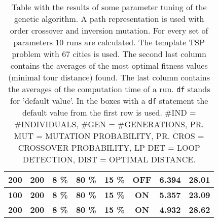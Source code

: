 \begin{table}[!]
\begin{tabular}{|c|c|c|c|c|c|c|c|}
\textbf{200}         & \textbf{200}         & \textbf{8 \%}          & \textbf{80 \%}          & \textbf{15 \%}       & \textbf{OFF}          & \textbf{6.394}        & \textbf{28.01}                \\ \hline
\textbf{100}         & \textbf{200}         & \textbf{8 \%}          & \textbf{80 \%}          & \textbf{15 \%}       & \textbf{ON}           & \textbf{5.357}        & \textbf{23.09}                \\ \hline
\textbf{200}         & \textbf{200}         & \textbf{8 \%}          & \textbf{80 \%}          & \textbf{15 \%}       & \textbf{ON}           & \textbf{4.932}        & \textbf{28.62}                \\ \hline
\end{tabular}
\caption{Table with the results of some parameter tuning of the genetic algorithm. A path representation is used with order crossover and inversion mutation. For every set of parameters 10 runs are calculated. The template TSP problem with $67$ cities is used. The second last column contains the averages of the most optimal fitness values (minimal tour distance) found. The last column contains the averages of the computation time of a run. \texttt{df} stands for 'default value'. In the boxes with a \texttt{df} statement the default value from the first row is used. \#IND = \#INDIVIDUALS, \#GEN = \#GENERATIONS, PR. MUT = MUTATION PROBABILITY, PR. CROS = CROSSOVER PROBABILITY, LP DET = LOOP DETECTION, DIST = OPTIMAL DISTANCE. }
\label{table:question_3}
\end{table}

